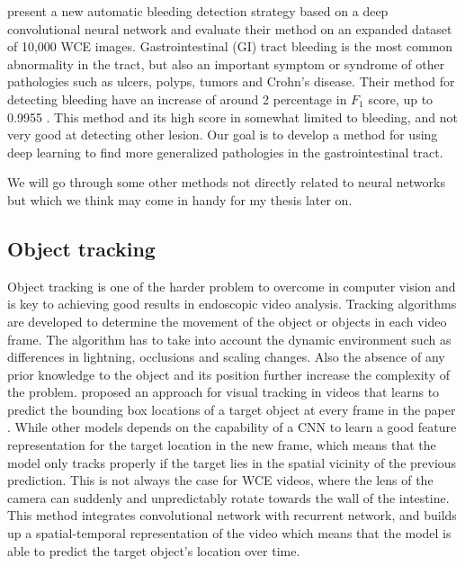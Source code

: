\documentclass[thesis.tex]{subfiles}
\begin{document}
\medbreak
\citeauthor*{DeepConvolutional16} present a new automatic bleeding detection strategy based on a deep convolutional neural network and evaluate their method on an expanded dataset of 10,000 WCE images. Gastrointestinal (GI) tract bleeding is the most common abnormality in the tract, but also an important symptom or syndrome of other pathologies such as ulcers, polyps, tumors and Crohn's disease. Their method for detecting bleeding have an increase of around 2 percentage in $F_1$ score, up to 0.9955 \cite{DeepConvolutional16}. This method and its high score in somewhat limited to bleeding, and not very good at detecting other lesion. 
Our goal is to develop a method for using deep learning to find more generalized pathologies in the gastrointestinal tract.

\medbreak
We will go through some other methods not directly related to neural networks but which we think may come in handy for my thesis later on. 


\subsection{Object tracking}
Object tracking is one of the harder problem to overcome in computer vision and is key to achieving good results in endoscopic video analysis. Tracking algorithms are developed to determine the movement of the object or objects in each video frame. The algorithm has to take into account the dynamic environment such as differences in lightning, occlusions and scaling changes. Also the absence of any prior knowledge to the object and its position further increase the complexity of the problem. \citeauthor*{DeepReinforcement17} proposed an approach for visual tracking in videos that learns to predict the bounding box locations of a target object at every frame in the paper  \cite{DeepReinforcement17}. While other models depends on the capability of a CNN to learn a good feature representation for the target location in the new frame, which means that the model only tracks properly if the target lies in the spatial vicinity of the previous prediction. This is not always the case for WCE videos, where the lens of the camera can suddenly and unpredictably rotate towards the wall of the intestine. This method integrates convolutional network with recurrent network, and builds up a spatial-temporal representation of the video which means that the model is able to predict the target object's location over time.
\end{document}
